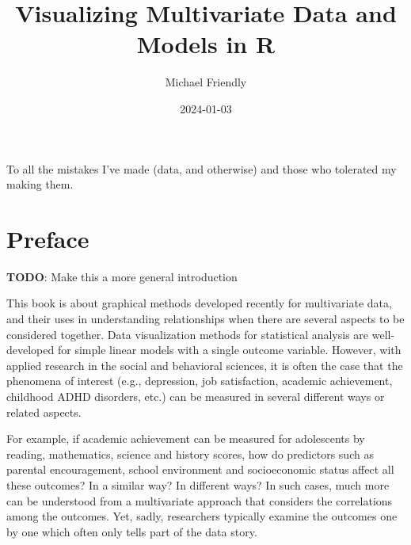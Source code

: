\documentclass[
  letterpaper,
  10pt,
  krantz2]{krantz}
\title{Visualizing Multivariate Data and Models in R}
\author{Michael Friendly}
\date{2024-01-03}
\renewcommand*\contentsname{Table of contents}
\newcommand\contentsname{Table of contents}
\begin{document}
\maketitle

\thispagestyle{empty}

\begin{center}
To all the mistakes I've made (data, and otherwise) and those who tolerated my making them.
\end{center}

\setlength{\abovedisplayskip}{-5pt}
\setlength{\abovedisplayshortskip}{-5pt}

\ifdefined\Shaded\renewenvironment{Shaded}{\begin{tcolorbox}[interior hidden, sharp corners, boxrule=0pt, breakable, frame hidden, borderline west={3pt}{0pt}{shadecolor}, enhanced]}{\end{tcolorbox}}\fi

\renewcommand*\contentsname{Table of contents}
{
\hypersetup{linkcolor=}
\setcounter{tocdepth}{2}
\tableofcontents
}

\hypertarget{preface}{%
\chapter*{Preface}\label{preface}}


\textbf{TODO}: Make this a more general introduction

This book is about graphical methods developed recently for multivariate
data, and their uses in understanding relationships when there are
several aspects to be considered together. Data visualization methods
for statistical analysis are well-developed for simple linear models
with a single outcome variable. However, with applied research in the
social and behavioral sciences, it is often the case that the phenomena
of interest (e.g., depression, job satisfaction, academic achievement,
childhood ADHD disorders, etc.) can be measured in several different
ways or related aspects.

For example, if academic achievement can be measured for adolescents by
reading, mathematics, science and history scores, how do predictors such
as parental encouragement, school environment and socioeconomic status
affect all these outcomes? In a similar way? In different ways? In such
cases, much more can be understood from a multivariate approach that
considers the correlations among the outcomes. Yet, sadly, researchers
typically examine the outcomes one by one which often only tells part of
the data story.
\end{document}
